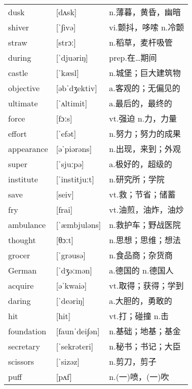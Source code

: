 \documentclass[a4paper]{article}
\begin{document}
\section{}
\begin{tabular}{l l l}

dusk & [dʌsk] & n.薄暮，黄昏，幽暗 \\
shiver & [ˈ∫ivə] & vi.颤抖，哆嗦 n.冷颤 \\
straw & [strɔː] & n.稻草，麦杆吸管 \\
during & [ˈdjuəriŋ] & prep.在…期间 \\
castle & [ˈkæsl] & n.城堡；巨大建筑物 \\
objective & [əbˈdʒektiv] & a.客观的；无偏见的 \\
ultimate & [ˈʌltimit] & a.最后的，最终的 \\
force & [fɔːs] & vt.强迫 n.力，力量 \\
effort & [ˈefət] & n.努力；努力的成果 \\
appearance & [əˈpiərəns] & n.出现，来到；外观 \\
super & [ˈsjuːpə] & a.极好的，超级的 \\
institute & [ˈinstitjuːt] & n.研究所；学院 \\
save & [seiv] & vt.救；节省；储蓄 \\
fry & [frai] & vt.油煎，油炸，油炒 \\
ambulance & [ˈæmbjuləns] & n.救护车；野战医院 \\
thought & [θɔːt] & n.思想；思维；想法 \\
grocer & [ˈgrəusə] & n.食品商；杂货商 \\
German & [ˈdʒəːmən] & a.德国的 n.德国人 \\
acquire & [əˈkwaiə] & vt.取得；获得；学到 \\
daring & [ˈdeəriŋ] & a.大胆的，勇敢的 \\
hit & [hit] & vt.打；碰撞 n.击 \\
foundation & [faunˈdei∫ən] & n.基础；地基；基金 \\
secretary & [ˈsekrəteri] & n.秘书；书记；大臣 \\
scissors & [ˈsizəz] & n.剪刀，剪子 \\
puff & [pʌf] & n.(一)喷，(一)吹 \\

\end{tabular}
\end{document}
